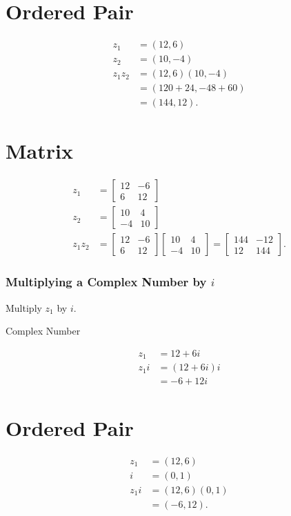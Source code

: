 \documentclass[10pt]{article}
\begin{document}
\section{Ordered Pair}
$$
\begin{aligned}
z_{1} & =(12,6) \\
z_{2} & =(10,-4) \\
z_{1} z_{2} & =(12,6)(10,-4) \\
& =(120+24,-48+60) \\
& =(144,12) .
\end{aligned}
$$

\section{Matrix}
$$
\begin{aligned}
z_{1} & =\left[\begin{array}{cc}
12 & -6 \\
6 & 12
\end{array}\right] \\
z_{2} & =\left[\begin{array}{cc}
10 & 4 \\
-4 & 10
\end{array}\right] \\
z_{1} z_{2} & =\left[\begin{array}{cc}
12 & -6 \\
6 & 12
\end{array}\right]\left[\begin{array}{cc}
10 & 4 \\
-4 & 10
\end{array}\right]=\left[\begin{array}{cc}
144 & -12 \\
12 & 144
\end{array}\right] .
\end{aligned}
$$

\subsubsection{Multiplying a Complex Number by $i$}
Multiply $z_{1}$ by $i$.

Complex Number

$$
\begin{aligned}
z_{1} & =12+6 i \\
z_{1} i & =(12+6 i) i \\
& =-6+12 i
\end{aligned}
$$

\section{Ordered Pair}
$$
\begin{aligned}
z_{1} & =(12,6) \\
i & =(0,1) \\
z_{1} i & =(12,6)(0,1) \\
& =(-6,12) .
\end{aligned}
$$
\end{document}
